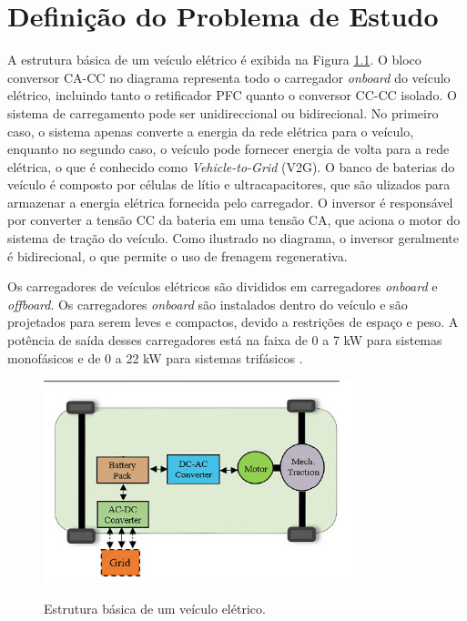 \chapter{Definição do Problema de Estudo}

A estrutura básica de um veículo elétrico é exibida na Figura \ref{fig:estrutura-veiculo-eletrico}. O bloco conversor CA-CC no diagrama representa todo o carregador \textit{onboard} do
 veículo elétrico, incluindo tanto o retificador PFC quanto o conversor CC-CC isolado. O sistema de carregamento pode ser unidireccional ou bidirecional. No primeiro
 caso, o sistema apenas converte a energia da rede elétrica para o veículo, enquanto no segundo caso, o veículo pode fornecer energia de volta para a rede elétrica, o que é conhecido como
\textit{Vehicle-to-Grid} (V2G). O banco de baterias do veículo é composto por células de lítio e ultracapacitores, que são ulizados para armazenar a energia elétrica fornecida pelo carregador.
O inversor é responsável por converter a tensão CC da bateria em uma tensão CA, que aciona o motor do sistema de tração do veículo. Como ilustrado no diagrama, o inversor geralmente é
bidirecional, o que permite o uso de frenagem regenerativa. 

Os carregadores de veículos elétricos são divididos em carregadores \textit{onboard} e \textit{offboard}. Os carregadores \textit{onboard} são instalados dentro do veículo e são 
projetados para serem leves e compactos, devido a restrições de espaço e peso. A potência de saída desses carregadores está na faixa de 0 a 7 kW para sistemas monofásicos e de 0 a 22 kW
para sistemas trifásicos \cite{Yuan:2021}.

\begin{figure}[h]
    \centering
    \caption{Estrutura básica de um veículo elétrico.}
    \includegraphics[width=0.8\textwidth]{figuras/diagrama_veiculo_eletrico_edit.png}
    \label{fig:estrutura-veiculo-eletrico}
\end{figure}

